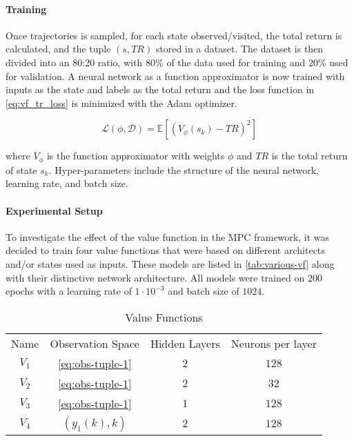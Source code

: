 \paragraph{Training}
Once trajectories is sampled, for each state observed/visited, the total return is calculated, and the tuple $(s,TR)$ stored in a dataset. The dataset is then divided into an 80:20 ratio, with 80\% of the data used for training and 20\% used for validation.  A neural network as a function approximator is now trained with inputs as the state and labels as the total return and the loss function in \autoref{eq:vf_tr_loss} is minimized with the Adam optimizer.

\begin{equation}\label{eq:vf_tr_loss}
    \mathcal{L}(\phi, \mathcal{D}) =  \mathbb{E} [(V_{\phi}(s_k) - TR)^2]
\end{equation}

where $V_{\phi}$ is the function approximator with weights $\phi$ and $TR$ is the total return of state $s_k$. Hyper-parameters include the structure of the neural network, learning rate, and batch size.


\paragraph{Experimental Setup}
To investigate the effect of the value function in the MPC framework, it was decided to train four value functions that were based on different architects and/or states used as inputs. These models are listed in \autoref{tab:various-vf} along with their distinctive network architecture. All models were trained on 200 epochs with a learning rate of $1 \cdot 10^{-3}$ and batch size of $1024$.

\begin{table}[H]
    \centering
    \begin{tabular}{|c|c|c|c|}
    \hline
         Name & Observation Space & Hidden Layers & Neurons per layer   \\
         $V_1$& \autoref{eq:obs-tuple-1} & $2$ & $128$ \\  
         $V_2$& \autoref{eq:obs-tuple-1} & $2$ & $32$ \\  
         $V_3$& \autoref{eq:obs-tuple-1} & $1 $& $128$ \\  
         $V_4$& $(y_1(k),k)$ & $2$ & $128$ \\  
         \hline
    \end{tabular}
    \caption{Value Functions}
    \label{tab:various-vf}
\end{table}

